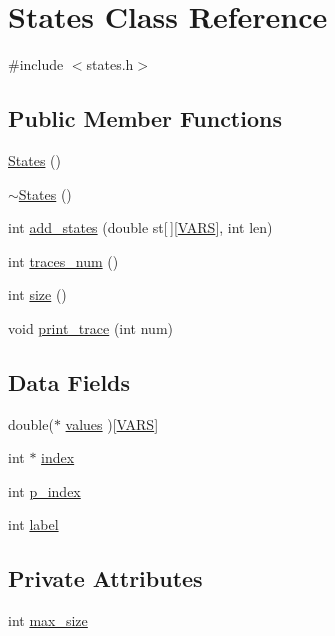\hypertarget{classStates}{}\section{States Class Reference}
\label{classStates}


{\ttfamily \#include $<$states.\+h$>$}

\subsection*{Public Member Functions}
\begin{DoxyCompactItemize}
\item 
\hyperlink{classStates_a77357dcd7269296068b166a86c035a4b}{States} ()
\item 
\hyperlink{classStates_a537d87c299ae42198d2f21f1bb046ec3}{$\sim$\+States} ()
\item 
int \hyperlink{classStates_ad6ea525e3db09581e11a80fac83201fd}{add\+\_\+states} (double st\mbox{[}$\,$\mbox{]}\mbox{[}\hyperlink{config_8h_a1d6565a8ececd15de44965eec4790919}{V\+A\+RS}\mbox{]}, int len)
\item 
int \hyperlink{classStates_a037a0060888bb6fc519783f3f06284f4}{traces\+\_\+num} ()
\item 
int \hyperlink{classStates_aff348a13a96c0699227f0dd49af5f51c}{size} ()
\item 
void \hyperlink{classStates_a25b5dab291f24971d9ddb1ff006a7cf4}{print\+\_\+trace} (int num)
\end{DoxyCompactItemize}
\subsection*{Data Fields}
\begin{DoxyCompactItemize}
\item 
double($\ast$ \hyperlink{classStates_a8b9a87b26c50e560d98c98d7e18f36b4}{values} )\mbox{[}\hyperlink{config_8h_a1d6565a8ececd15de44965eec4790919}{V\+A\+RS}\mbox{]}
\item 
int $\ast$ \hyperlink{classStates_ac7f438346962624026633389d156b5d0}{index}
\item 
int \hyperlink{classStates_a13e3842ad77b702e0f68cf875ded9534}{p\+\_\+index}
\item 
int \hyperlink{classStates_ab444a833f85348e8a850962da6c2c987}{label}
\end{DoxyCompactItemize}
\subsection*{Private Attributes}
\begin{DoxyCompactItemize}
\item 
int \hyperlink{classStates_a97d0d50850ab25e50914982341bba129}{max\+\_\+size}
\end{DoxyCompactItemize}
